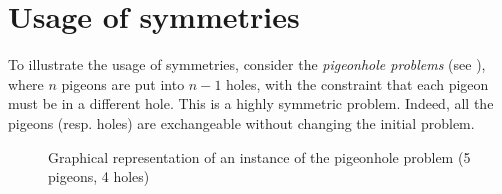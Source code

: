  
% 

\section{Usage of symmetries}


To illustrate the usage of symmetries, consider the \textit{pigeonhole problems} (see ), where $n$ pigeons are put into $n-1$ holes, with the constraint that each pigeon must be in a different hole. This is a
highly symmetric problem. Indeed, all the pigeons (resp. holes) are exchangeable
without changing the initial problem.

\begin{figure}[!htbp]
	\centering
	\caption{Graphical representation of an instance of the pigeonhole problem (5 pigeons, 4 holes)}
	\label{fig:hole}
\end{figure}

